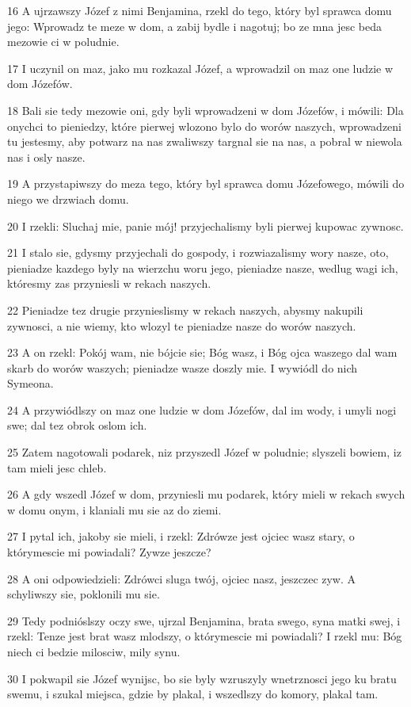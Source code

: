\par 16 A ujrzawszy Józef z nimi Benjamina, rzekl do tego, który byl sprawca domu jego: Wprowadz te meze w dom, a zabij bydle i nagotuj; bo ze mna jesc beda mezowie ci w poludnie.
\par 17 I uczynil on maz, jako mu rozkazal Józef, a wprowadzil on maz one ludzie w dom Józefów.
\par 18 Bali sie tedy mezowie oni, gdy byli wprowadzeni w dom Józefów, i mówili: Dla onychci to pieniedzy, które pierwej wlozono bylo do worów naszych, wprowadzeni tu jestesmy, aby potwarz na nas zwaliwszy targnal sie na nas, a pobral w niewola nas i osly nasze.
\par 19 A przystapiwszy do meza tego, który byl sprawca domu Józefowego, mówili do niego we drzwiach domu.
\par 20 I rzekli: Sluchaj mie, panie mój! przyjechalismy byli pierwej kupowac zywnosc.
\par 21 I stalo sie, gdysmy przyjechali do gospody, i rozwiazalismy wory nasze, oto, pieniadze kazdego byly na wierzchu woru jego, pieniadze nasze, wedlug wagi ich, któresmy zas przyniesli w rekach naszych.
\par 22 Pieniadze tez drugie przynieslismy w rekach naszych, abysmy nakupili zywnosci, a nie wiemy, kto wlozyl te pieniadze nasze do worów naszych.
\par 23 A on rzekl: Pokój wam, nie bójcie sie; Bóg wasz, i Bóg ojca waszego dal wam skarb do worów waszych; pieniadze wasze doszly mie. I wywiódl do nich Symeona.
\par 24 A przywiódlszy on maz one ludzie w dom Józefów, dal im wody, i umyli nogi swe; dal tez obrok oslom ich.
\par 25 Zatem nagotowali podarek, niz przyszedl Józef w poludnie; slyszeli bowiem, iz tam mieli jesc chleb.
\par 26 A gdy wszedl Józef w dom, przyniesli mu podarek, który mieli w rekach swych w domu onym, i klaniali mu sie az do ziemi.
\par 27 I pytal ich, jakoby sie mieli, i rzekl: Zdrówze jest ojciec wasz stary, o którymescie mi powiadali? Zywze jeszcze?
\par 28 A oni odpowiedzieli: Zdrówci sluga twój, ojciec nasz, jeszczec zyw. A schyliwszy sie, poklonili mu sie.
\par 29 Tedy podnióslszy oczy swe, ujrzal Benjamina, brata swego, syna matki swej, i rzekl: Tenze jest brat wasz mlodszy, o którymescie mi powiadali? I rzekl mu: Bóg niech ci bedzie milosciw, mily synu.
\par 30 I pokwapil sie Józef wynijsc, bo sie byly wzruszyly wnetrznosci jego ku bratu swemu, i szukal miejsca, gdzie by plakal, i wszedlszy do komory, plakal tam.
